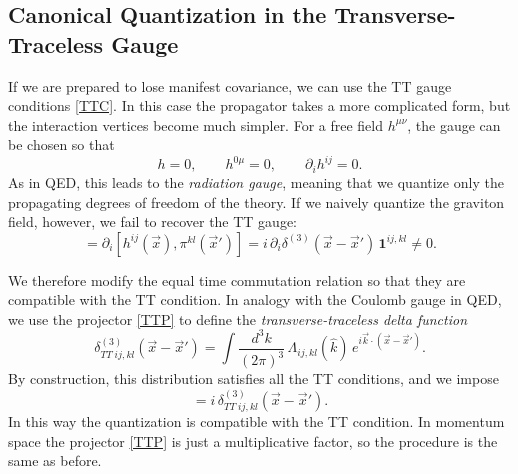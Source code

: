 \documentclass[12pt,a4paper,oneside]{article}
\numberwithin{equation}{section}   %
\begin{document}
\subsection{Canonical Quantization in the Transverse-Traceless Gauge}
If we are prepared to lose manifest covariance, we can use the TT gauge conditions
\eqref{TTC}. In this case the propagator takes a more complicated form, but the
interaction vertices become much simpler.
For a free field $h^{\mu\nu}$, the gauge can be chosen so that
\begin{equation*}
    h=0,\qquad h^{0\mu}=0,\qquad \partial_i h^{ij}=0 .
\end{equation*}
As in QED, this leads to the \textit{radiation gauge}, meaning that we quantize
only the propagating degrees of freedom of the theory.
If we naively quantize the graviton field, however, we fail to recover the TT
gauge:
\begin{equation}
[\partial_i h^{ij}(\vec x),\pi^{kl}(\vec x')]
= \partial_i [h^{ij}(\vec x),\pi^{kl}(\vec x')]
= i\,\partial_i \delta^{(3)}(\vec{x}-\vec{x}')\,\mathbf{1}^{ij,kl}\neq 0 .
\end{equation}

We therefore modify the equal time commutation
relation so that they are compatible with the TT condition.
In analogy with the Coulomb gauge in QED, we use the projector \eqref{TTP} to
define the \textit{transverse-traceless delta function}
\begin{equation}\label{TTD}
    \delta^{(3)}_{TT\;ij,kl}(\vec{x}-\vec{x}')
    =\int\frac{d^3k}{(2\pi)^3}\,\Lambda_{ij,kl}(\hat k)\,
     e^{i\vec k\cdot(\vec x-\vec x')} .
\end{equation}
By construction, this distribution satisfies all the TT conditions, and we
impose
\begin{equation}
    [h_{ij}(\vec x,t),\pi_{kl}(\vec x',t)]= i\, \delta^{(3)}_{TT\;ij,kl}(\vec{x}-\vec{x}') .
\end{equation}
In this way the quantization is compatible with the TT condition. In momentum
space the projector \eqref{TTP} is just a multiplicative factor, so the
procedure is the same as before.
\end{document}
